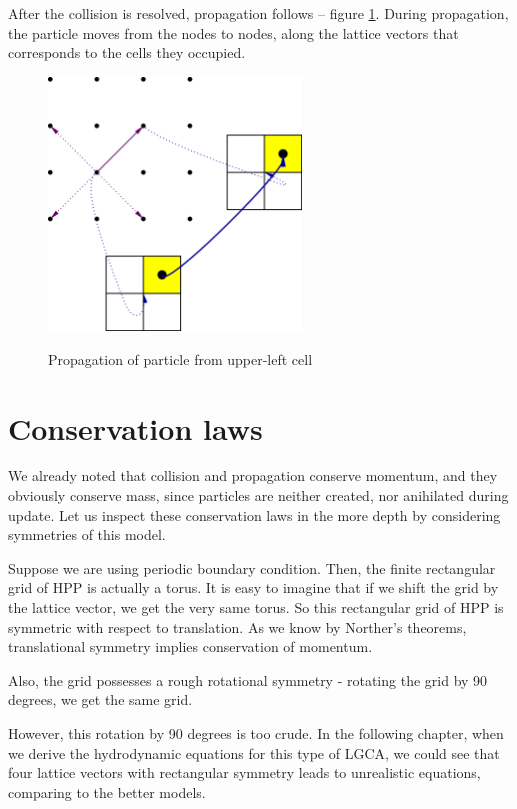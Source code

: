 After the collision is resolved, propagation follows -- figure \ref{hpp-colision}.
During propagation, the particle moves from the nodes to nodes, along the lattice vectors that corresponds to the cells they occupied.
\begin{figure} [H]
 \centering
 \includegraphics[width=0.6\textwidth]{./img/HPPprop}
 \label{hpp-colision}
 \caption{Propagation of particle from upper-left cell}
\end{figure}

\bigskip

\section{Conservation laws}

We already noted that collision and propagation conserve momentum, and they obviously conserve mass, since particles are neither created, nor anihilated during update. 
Let us inspect these conservation laws in the more depth by considering symmetries of this model.

Suppose we are using periodic boundary condition. Then, the finite rectangular grid of HPP is actually a torus. It is easy to imagine that if we shift the grid by the lattice vector, we get the very same torus.
So this rectangular grid of HPP is symmetric with respect to translation.
As we know by Norther's theorems, translational symmetry implies conservation of momentum.

\bigskip

Also, the grid possesses a rough rotational symmetry - rotating the grid by 90 degrees, we get the same grid.

However, this rotation by 90 degrees is too crude.
In the following chapter, when we derive the hydrodynamic equations for this type of LGCA, we could see that four lattice vectors with rectangular symmetry leads to unrealistic equations, comparing to the better models.

